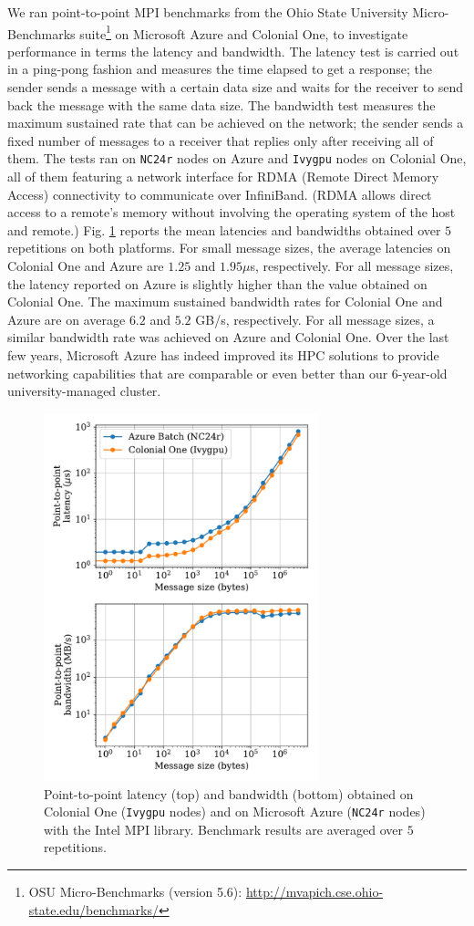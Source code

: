 \documentclass[10pt,journal,compsoc]{IEEEtran}
\begin{document}
We ran point-to-point MPI benchmarks from the Ohio State University Micro-Benchmarks suite\footnote{OSU Micro-Benchmarks (version 5.6): \url{http://mvapich.cse.ohio-state.edu/benchmarks/}} on Microsoft Azure and Colonial One, to investigate performance in terms the latency and bandwidth.
The latency test is carried out in a ping-pong fashion and measures the time elapsed to get a response; the sender sends a message with a certain data size and waits for the receiver to send back the message with the same data size.
The bandwidth test measures the maximum sustained rate that can be achieved on the network; the sender sends a fixed number of messages to a receiver that replies only after receiving all of them.
The tests ran on \texttt{NC24r} nodes on Azure and \texttt{Ivygpu} nodes on Colonial One, all of them featuring a network interface for RDMA (Remote Direct Memory Access) connectivity to communicate over InfiniBand.
(RDMA allows direct access to a remote's memory without involving the operating system of the host and remote.)
Fig. \ref{fig:osu_benchmarks} reports the mean latencies and bandwidths obtained over $5$ repetitions on both platforms.
For small message sizes, the average latencies on Colonial One and Azure are $1.25$ and $1.95 \mu $s, respectively.
For all message sizes, the latency reported on Azure is slightly higher than the value obtained on Colonial One.
The maximum sustained bandwidth rates for Colonial One and Azure are on average $6.2$ and $5.2$ GB/s, respectively.
For all message sizes, a similar bandwidth rate was achieved on Azure and Colonial One.
Over the last few years, Microsoft Azure has indeed improved its HPC solutions to provide networking capabilities that are comparable or even better than our 6-year-old university-managed cluster.

\begin{figure}[!h]
    \centering
    \includegraphics[width=8cm]{osu_latency_bandwidth.pdf}
    \caption{Point-to-point latency (top) and bandwidth (bottom) obtained on Colonial One (\texttt{Ivygpu} nodes) and on Microsoft Azure (\texttt{NC24r} nodes) with the Intel MPI library. Benchmark results are averaged over $5$ repetitions.}
    \label{fig:osu_benchmarks}
\end{figure}
\end{document}
